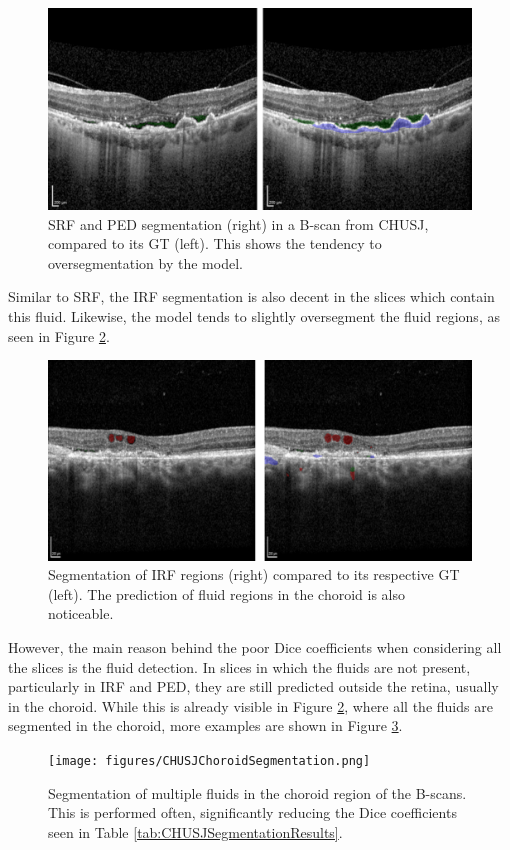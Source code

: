 \begin{figure}[!ht]
	\centering
	\includegraphics[width=0.60\linewidth]{figures/CHUSJSRFSegmentation.png}
	\caption{SRF and PED segmentation (right) in a B-scan from CHUSJ, compared to its GT (left). This shows the tendency to oversegmentation by the model.}
	\label{fig:CHUSJSRFSegmentation}
\end{figure}

Similar to SRF, the IRF segmentation is also decent in the slices which contain this fluid. Likewise, the model tends to slightly oversegment the fluid regions, as seen in Figure \ref{fig:CHUSJIRFSegmentation}. 

\begin{figure}[!ht]
	\centering
	\includegraphics[width=0.60\linewidth]{figures/CHUSJIRFSegmentation.png}
	\caption{Segmentation of IRF regions (right) compared to its respective GT (left). The prediction of fluid regions in the choroid is also noticeable.}
	\label{fig:CHUSJIRFSegmentation}
\end{figure}

However, the main reason behind the poor Dice coefficients when considering all the slices is the fluid detection. In slices in which the fluids are not present, particularly in IRF and PED, they are still predicted outside the retina, usually in the choroid. While this is already visible in Figure \ref{fig:CHUSJIRFSegmentation}, where all the fluids are segmented in the choroid, more examples are shown in Figure \ref{fig:CHUSJChoroidSegmentation}.

\begin{figure}[!ht]
	\centering	\texttt{[image: figures/CHUSJChoroidSegmentation.png]}
	\caption{Segmentation of multiple fluids in the choroid region of the B-scans. This is performed often, significantly reducing the Dice coefficients seen in Table \ref{tab:CHUSJSegmentationResults}.}
	\label{fig:CHUSJChoroidSegmentation}
\end{figure}

